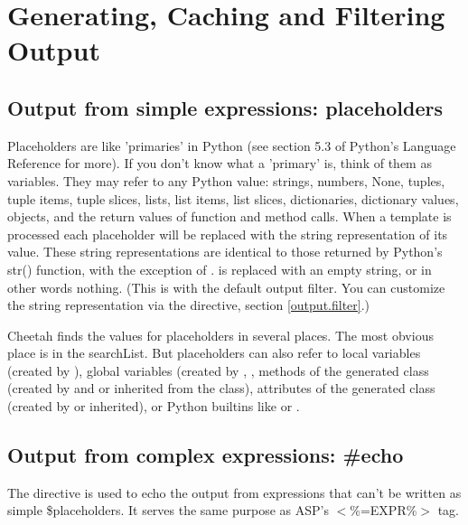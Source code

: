 \section{Generating, Caching and Filtering Output}
\label{output}

\subsection{Output from simple expressions: placeholders}
\label{output.placeholders}

Placeholders are like 'primaries' in Python (see section 5.3 of Python's
Language Reference for more). If you don't know what a 'primary' is, think of
them as variables. They may refer to any Python value: strings, numbers, None,
tuples, tuple items, tuple slices, lists, list items, list slices, dictionaries,
dictionary values, objects, and the return values of function and method calls.
When a template is processed each placeholder will be replaced with the string
representation of its value.  These string representations are identical to
those returned by Python's str() function, with the exception of .
 is replaced with an empty string, or in other words nothing.
(This is with the default output filter.  You can customize the string
representation via the  directive, section \ref{output.filter}.)

Cheetah finds the values for placeholders in several places.  The most obvious
place is in the searchList.  But placeholders can also refer to local variables
(created by ), global variables (created by , 
, methods of the generated class (created by 
 and  or inherited from the  class),
attributes of the generated class (created by  or inherited), or
Python builtins like  or .  

\subsection{Output from complex expressions: \#echo}
\label{output.echo}

The  directive is used to echo the output from expressions that
can't be written as simple \$placeholders.  It serves the same purpose as ASP's
$<$\%=EXPR\%$>$ tag.

